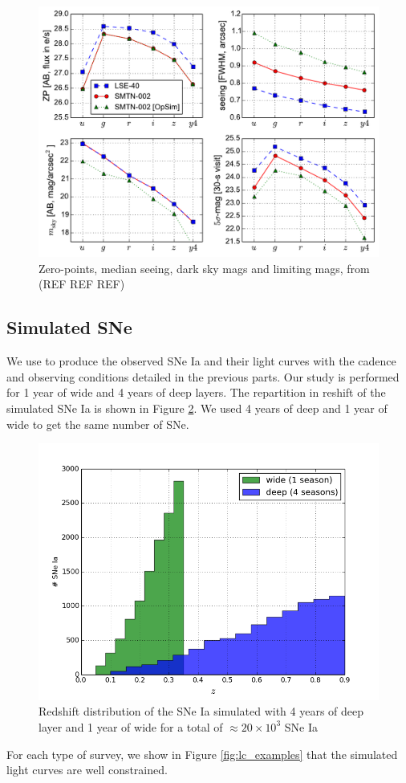 \documentclass[\docopts]{\docclass}
\begin{document}
\begin{figure}[t]
\begin{center}
\includegraphics[width=\linewidth]{lsst_model_summary.pdf}
\caption{Zero-points, median seeing, dark sky mags and limiting mags, from (REF REF REF)}
\label{fig:zp}
\end{center}
\end{figure}

\subsection{Simulated SNe}
\label{ssec::snsim}
We use  to produce the observed SNe Ia and their light curves with the cadence and observing conditions detailed in the previous parts.
Our study is performed for 1 year of wide and 4 years of deep layers.
The repartition in reshift of the simulated SNe Ia is shown in Figure \ref{fig:z_distrib}. We used 4 years of deep and 1 year of wide to get the same number of SNe.
\begin{figure}[ht]
  \centering
  \includegraphics[width=0.7\linewidth]{z_surveys_population.png}
  \caption{Redshift distribution of the SNe Ia simulated with 4 years of deep layer and 1 year of wide for a total of $\approx 20\times10^3$ SNe Ia}
  \label{fig:z_distrib}
\end{figure}
For each type of survey, we show in Figure \ref{fig:lc_examples} that the simulated light curves are well constrained.
\end{document}
